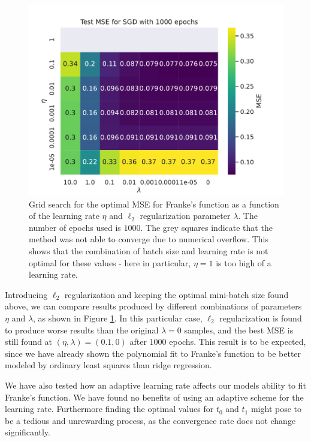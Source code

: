 \documentclass[aps,reprint,superscriptaddress,nofootinbib]{revtex4-2}
\begin{document}
\begin{figure}[h!]
    \centering
    \includegraphics[width=\linewidth]{part_a/4_mse_eta_reg_epochs_1000.pdf}
    \caption{Grid search for the optimal MSE for Franke's function as a function of the learning rate \(\eta\) and \(\ell_2\) regularization parameter \(\lambda\). The number of epochs used is \(1000\). The grey squares indicate that the method was not able to converge due to numerical overflow. This shows that the combination of batch size and learning rate is not optimal for these values - here in particular, \(\eta = 1\) is too high of a learning rate.}
    \label{fig:grid_mse_lmd_eta}
\end{figure}

Introducing \(\ell_2\) regularization and keeping the optimal mini-batch size found above, we can compare results produced by different combinations of parameters \(\eta\) and \(\lambda\), as shown in Figure \ref{fig:grid_mse_lmd_eta}. In this particular case, \(\ell_2\) regularization is found to produce worse results than the original \(\lambda=0\) samples, and the best MSE is still found at \((\eta,\lambda)=(0.1,0)\) after 1000 epochs. This result is to be expected, since we have already shown the polynomial fit to Franke's function to be better modeled by ordinary least squares than ridge regression.

We have also tested how an adaptive learning rate affects our models ability to fit Franke's function. We have found no benefits of using an adaptive scheme for the learning rate. Furthermore finding the optimal values for \(t_0\) and \(t_1\) might pose to be a tedious and unrewarding process, as the convergence rate does not change significantly.
\end{document}
